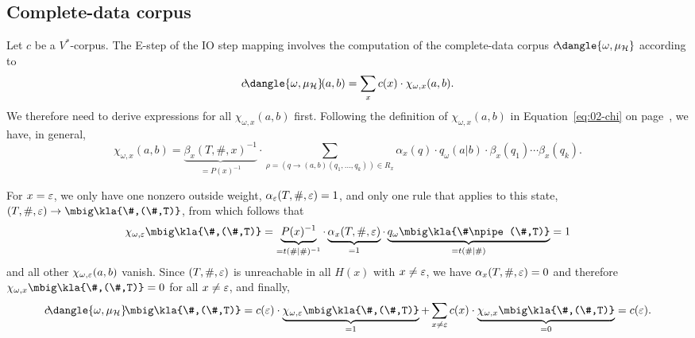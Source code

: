 \subsection{Complete-data corpus}

Let $c$ be a $V^*$-corpus. The E-step of the IO step mapping involves the
computation of the complete-data corpus $c\!\dangle{\omega,\mu_\uh}$ according to
\[
 c\!\dangle{\omega,\mu_\uh}\!(a,b) = \sum_x c(x) \cdot \chi_{\omega,x}(a,b).
\]
We therefore need to derive expressions for all $\chi_{\omega,x}(a,b)$ first.
Following the definition of $\chi_{\omega,x}(a,b)$ in
Equation~\eqref{eq:02-chi} on page~\pageref{eq:02-chi}, we have, in general,
\begin{equation}\label{eq:03-chi}
 \chi_{\omega,x}(a,b) = \underbrace{\beta_x(T,\#,x)^{-1}}_{=P(x)^{-1}} \cdot \sum_{\rho = (q\to(a,b)(q_1,\ldots,q_k))\in R_x} \alpha_x(q) \cdot q_\omega(a|b) \cdot \beta_x(q_1) \cdots \beta_x(q_k).
\end{equation}

For $x=\varepsilon$, we only have one nonzero outside weight, $\alpha_\varepsilon(T,\#,\varepsilon)
= 1$, and only one rule that applies to this state, $(T,\#,\eps) \to
\mbig\kla{\#,(\#,T)}$, from which follows that
\[
 \chi_{\omega,\eps}\mbig\kla{\#,(\#,T)} = \underbrace{P(x)^{-1}}_{=t(\#|\#)^{-1}} \cdot \underbrace{\alpha_x(T,\#,\eps)}_{=1} \cdot \underbrace{q_\omega\mbig\kla{\#\npipe(\#,T)}}_{=t(\#|\#)} = 1
\]
and all other $\chi_{\omega,\varepsilon}(a,b)$ vanish. Since $(T,\#,\varepsilon)$ is
unreachable in all $H(x)$ with $x\neq\varepsilon$, we have $\alpha_x(T,\#,\varepsilon) = 0$
and therefore $\chi_{\omega,x}\mbig\kla{\#,(\#,T)}=0$ for all $x\neq\varepsilon$, and finally,
\[
 c\!\dangle{\omega,\mu_\uh}\!\mbig\kla{\#,(\#,T)} = c(\eps) \cdot \underbrace{\chi_{\omega,\eps}\mbig\kla{\#,(\#,T)}}_{=1} + \sum_{x\neq\eps} c(x) \cdot \underbrace{\chi_{\omega,x}\mbig\kla{\#,(\#,T)}}_{=0} = c(\eps).
\]

